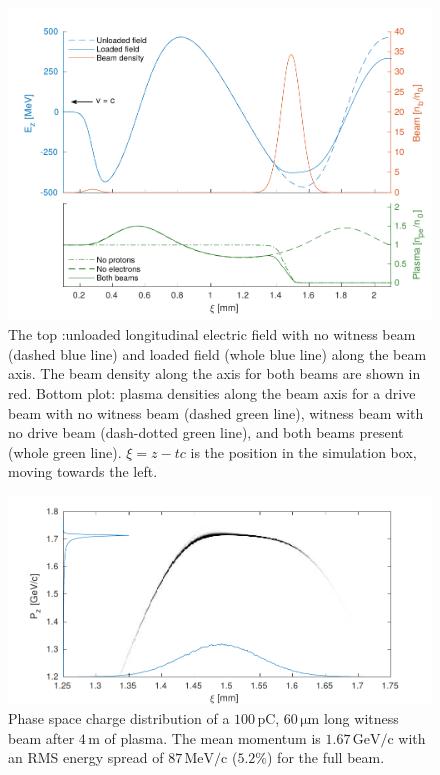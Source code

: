 \documentclass[aps,prstab,reprint,amsmath,amssymb,groupedaddress,onecolumn]{revtex4-1}
\newcommand{\unit}[1]{\,\mathrm{#1}}
\begin{document}
\begin{figure}[hbt]
    \includegraphics[width=\linewidth,trim={2mm 0mm 2mm 0mm},clip]{figures/beamLoading}
    \caption{\label{Fig:BeamLoading} The top%
:unloaded longitudinal electric field with no witness beam
        (dashed blue line) and %
        loaded field (whole blue line) along the beam axis. The beam density along the axis
        for both beams are shown in red. %
        Bottom plot: plasma densities along the beam axis for a drive
        beam with no witness beam (dashed green line), witness beam with no drive beam (dash-dotted green line), and
        both beams present (whole green line). $\xi = z - tc$ is the position in the simulation box, moving towards the
        left.}
\end{figure}

\begin{figure}[hbt]
    \includegraphics[width=\linewidth,trim={2mm 0mm 2mm 0mm},clip]{figures/beamPhaseSpace}
    \caption{\label{Fig:BeamPS} %
    Phase space charge distribution of a $100\unit{pC}$, $60\unit{\mu m}$ long witness
        beam after $4\unit{m}$ of plasma. The mean momentum is $1.67\unit{GeV/c}$ with an RMS energy spread of
        $87\unit{MeV/c}$ ($5.2\%$) for the full beam.}
\end{figure}
\end{document}
